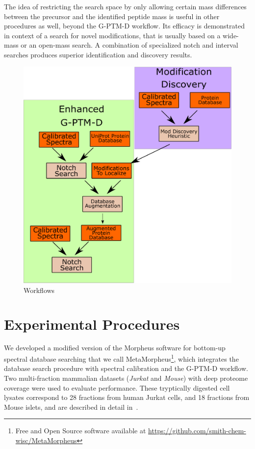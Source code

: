 \documentclass[journal=jprobs,manuscript=article]{achemso}
\begin{document}
The idea of restricting the search space by only allowing certain mass differences between the precursor and the identified peptide mass is useful in other procedures as well, beyond the G-PTM-D workflow.
Its efficacy is demonstrated in context of a search for novel modifications, that is usually based on a wide-mass or an open-mass search.
A combination of specialized notch and interval searches produces superior identification and discovery results.

\begin{figure}[H]
  \includegraphics{diagram.eps}
  \caption{Workflows}
  \label{fgr:diagram}
\end{figure}


\section{Experimental Procedures}
We developed a modified version of the Morpheus software for bottom-up spectral database searching\cite{Wenger_2013} that we call MetaMorpheus\footnote{Free and Open Source software available at \url{https://github.com/smith-chem-wisc/MetaMorpheus}}, which integrates the database search procedure with spectral calibration and the G-PTM-D workflow.
Two multi-fraction mammalian datasets (\textit{Jurkat} and \textit{Mouse}) with deep proteome coverage were used to evaluate performance.
These tryptically digested cell lysates correspond to 28 fractions from human Jurkat cells, and 18 fractions from Mouse islets, and are described in detail in~\cite{Shortreed_2015, Cesnik_2016}.
\end{document}
